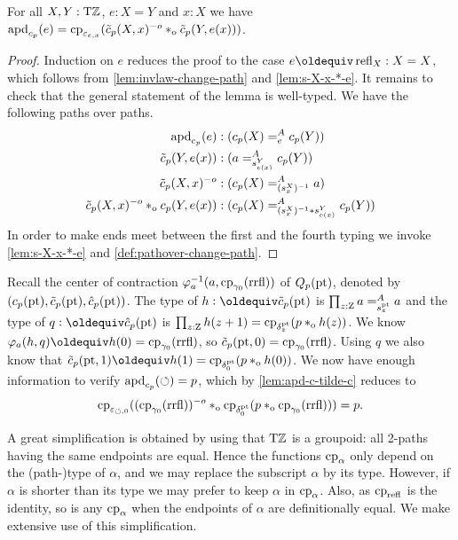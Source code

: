 \documentclass[a4paper,12pt]{amsart}
\begin{document}

\begin{lemma}\label{lem:apd-c-tilde-c}
For all $X,Y:{\mathrm{T}\mathbb{Z}}$, $e: X=Y$ and $x:X$ we have
$\mathop{{\mathrm{apd}}_{c_p}}(e) = \mathrm{cp}_{\varepsilon_{e,x}}
(\tilde c_p(X,x)^{-o}*_{\mathrm{o}} \tilde c_p(Y,e(x)))$.
\end{lemma}
\begin{proof}
Induction on $e$ reduces the proof to the case $e\jdeq\refl{X}: X=X$,
which follows from \cref{lem:invlaw-change-path} and \cref{lem:s-X-x-*-e}.
It remains to check that the general statement of the lemma is well-typed.
We have the following paths over paths.
\begin{align*}
\mathop{{\mathrm{apd}}_{c_p}}(e) &: (c_p(X) =^A_e c_p(Y))\\
\tilde c_p(Y,e(x)) &:  (a =^A_{s^Y_{e(x)}} c_p(Y))\\
\tilde c_p(X,x)^{-o} &: (c_p(X) =^A_{(s^X_x)^{-1}} a)\\
\tilde c_p(X,x)^{-o} *_{\mathrm{o}} c_p(Y,e(x)) &:
     (c_p(X) =^A_{(s^X_x)^{-1}* s^Y_{e(x)}} c_p(Y))
\end{align*}
In order to make ends meet between the first and the fourth typing
we invoke \cref{lem:s-X-x-*-e} and \cref{def:pathover-change-path}.
\end{proof}

Recall the center of contraction $\varphi_{a}^{-1}(a,\mathrm{cp}_{\gamma_0}(\mathrm{rrfl}))$
of $Q_p({\mathord{\mathrm{pt}}})$, denoted by $(c_p({\mathord{\mathrm{pt}}}),\tilde{c}_p({\mathord{\mathrm{pt}}}),\hat{c}_p({\mathord{\mathrm{pt}}}))$.
The type of $h\defeq\tilde{c}_p(\pt)$ is $\prod_{z:\mathrm{Z}} a =^A_{s^{\mathord{\mathrm{pt}}}_z} a$ and
the type of $q\defeq\hat{c}_p(\pt)$ is $\prod_{z:\mathrm{Z}} h(z+1) = \mathrm{cp}_{\delta^{\mathord{\mathrm{pt}}}_z}(p *_{\mathrm{o}} h(z))$.
We know $\varphi_{a}(h,q) \jdeq h(0) = \cp{\gamma_0}(\rrfl)$,
so $\tilde c_p({\mathord{\mathrm{pt}}},0) = \mathrm{cp}_{\gamma_0}(\mathrm{rrfl})$.
Using $q$ we also know that
$\tilde c_p(\pt,1) \jdeq h(1) = \cp{\delta^\pt_0}(p \cto h(0))$.
We now have enough information to verify $\mathop{{\mathrm{apd}}_{c_p}}({\circlearrowleft})=p$,
which by \cref{lem:apd-c-tilde-c} reduces to
\[
\mathrm{cp}_{\varepsilon_{{\circlearrowleft},0}}
((\mathrm{cp}_{\gamma_0}(\mathrm{rrfl}))^{-o}*_{\mathrm{o}}
\mathrm{cp}_{\delta^{\mathord{\mathrm{pt}}}_0}(p *_{\mathrm{o}} \mathrm{cp}_{\gamma_0}(\mathrm{rrfl}))) = p.
\]

A great simplification is obtained by using that ${\mathrm{T}\mathbb{Z}}$ is a groupoid:
all 2-paths having the same endpoints are equal.
Hence the functions $\mathrm{cp}_{\alpha}$ only depend on the (path-)type
of $\alpha$, and we may replace the subscript $\alpha$ by its type.
However, if $\alpha$ is shorter than its type we may
prefer to keep $\alpha$ in $\mathrm{cp}_{\alpha}$.
Also, as $\mathrm{cp}_{\mathop{{\mathrm{refl}}_{}}}$ is the identity, so is any $\mathrm{cp}_{\alpha}$
when the endpoints of $\alpha$ are definitionally equal.
{We make extensive use of this simplification}.
\end{document}
